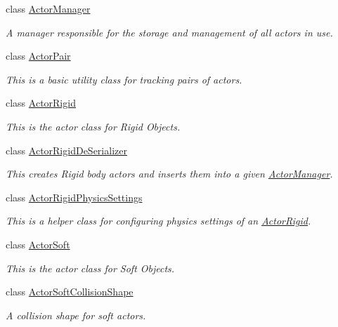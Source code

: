 \begin{DoxyCompactItemize}
class \hyperlink{classMezzanine_1_1ActorManager}{ActorManager}
\begin{DoxyCompactList}\small\item\em A manager responsible for the storage and management of all actors in use. \item\end{DoxyCompactList}\item 
class \hyperlink{classMezzanine_1_1ActorPair}{ActorPair}
\begin{DoxyCompactList}\small\item\em This is a basic utility class for tracking pairs of actors. \item\end{DoxyCompactList}\item 
class \hyperlink{classMezzanine_1_1ActorRigid}{ActorRigid}
\begin{DoxyCompactList}\small\item\em This is the actor class for Rigid Objects. \item\end{DoxyCompactList}\item 
class \hyperlink{classMezzanine_1_1ActorRigidDeSerializer}{ActorRigidDeSerializer}
\begin{DoxyCompactList}\small\item\em This creates Rigid body actors and inserts them into a given \hyperlink{classMezzanine_1_1ActorManager}{ActorManager}. \item\end{DoxyCompactList}\item 
class \hyperlink{classMezzanine_1_1ActorRigidPhysicsSettings}{ActorRigidPhysicsSettings}
\begin{DoxyCompactList}\small\item\em This is a helper class for configuring physics settings of an \hyperlink{classMezzanine_1_1ActorRigid}{ActorRigid}. \item\end{DoxyCompactList}\item 
class \hyperlink{classMezzanine_1_1ActorSoft}{ActorSoft}
\begin{DoxyCompactList}\small\item\em This is the actor class for Soft Objects. \item\end{DoxyCompactList}\item 
class \hyperlink{classMezzanine_1_1ActorSoftCollisionShape}{ActorSoftCollisionShape}
\begin{DoxyCompactList}\small\item\em A collision shape for soft actors. \item\end{DoxyCompactList}\item 

\end{DoxyCompactItemize}
